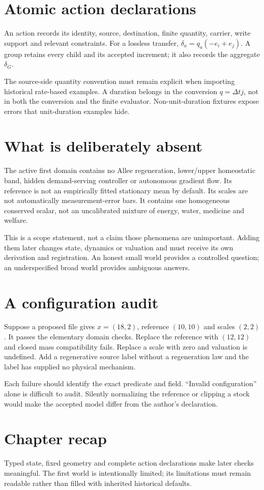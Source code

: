 \section{Atomic action declarations}
An action records its identity, source, destination, finite quantity, carrier,
write support and relevant constraints. For a lossless transfer,
$\delta_a=q_a(-e_i+e_j)$. A group retains every child and its accepted
increment; it also records the aggregate $\delta_G$.

The source-side quantity convention must remain explicit when importing
historical rate-based examples. A duration belongs in the conversion
$q=\Delta t j$, not in both the conversion and the finite evaluator.
Non-unit-duration fixtures expose errors that unit-duration examples hide.

\section{What is deliberately absent}
The active first domain contains no Allee regeneration, lower/upper
homeostatic band, hidden demand-serving controller or autonomous gradient
flow. Its reference is not an empirically fitted stationary mean by default.
Its scales are not automatically measurement-error bars. It contains one
homogeneous conserved scalar, not an uncalibrated mixture of energy, water,
medicine and welfare.

This is a scope statement, not a claim those phenomena are unimportant.
Adding them later changes state, dynamics or valuation and must receive
its own derivation and registration. An honest small world provides a
controlled question; an underspecified broad world provides ambiguous answers.

\section*{A configuration audit}
Suppose a proposed file gives $x=(18,2)$, reference $(10,10)$ and
scales $(2,2)$. It passes the elementary domain checks. Replace the reference
with $(12,12)$ and closed mass compatibility fails. Replace a scale with
zero and valuation is undefined. Add a regenerative source label without
a regeneration law and the label has supplied no physical mechanism.

Each failure should identify the exact predicate and field. ``Invalid
configuration'' alone is difficult to audit. Silently normalizing the
reference or clipping a stock would make the accepted model differ from
the author's declaration.

\section*{Chapter recap}
Typed state, fixed geometry and complete action declarations make later
checks meaningful. The first world is intentionally limited; its limitations
must remain readable rather than filled with inherited historical defaults.
